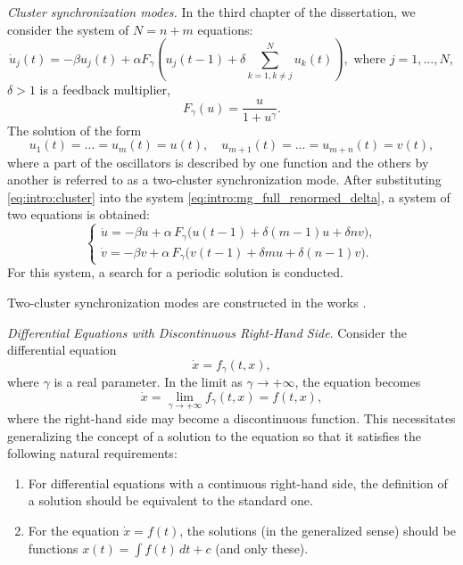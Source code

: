\textit{Cluster synchronization modes.} 
In the third chapter of the dissertation, we consider the system of $N = n + m$ equations:
\begin{equation}
	\label{eq:intro:mg_full_renormed_delta}
	\dot{u}_j(t) = -\beta u_j(t) + \alpha F_{\gamma} \left(u_j(t - 1) + \delta\sum\limits_{k = 1, k\neq j}^N u_k(t)\right), \text{ where } j = 1, \dots, N,
\end{equation}
$\delta > 1$ is a feedback multiplier, 
\[
F_{\gamma}(u) = \dfrac{u}{1 + u^{\gamma}}.
\]
The solution of the form
\begin{equation}
	\label{eq:intro:cluster}
	u_1(t)=\ldots=u_m(t) = u(t),\quad u_{m+1}(t)=\ldots=u_{m+n}(t) = v(t),
\end{equation}
where a part of the oscillators is described by one function and the others by another is referred to as a two-cluster synchronization mode. After substituting \eqref{eq:intro:cluster} into the system \eqref{eq:intro:mg_full_renormed_delta}, a system of two equations is obtained:
%
\begin{equation}
	\label{eq:intro:system_uv}
	\begin{cases}
		\dot{u} = -\beta u + \alpha \, F_{\gamma} \big(u(t - 1) + \delta (m - 1) u + \delta n v\big),\\
		\dot{v} = -\beta v + \alpha \, F_{\gamma} \big(v(t - 1) + \delta m u + \delta (n - 1) v\big).
	\end{cases}
\end{equation}
%
For this system, a search for a periodic solution is conducted.

Two-cluster synchronization modes are constructed in the works \cite{Glyzin2016a, Glyzin2022}.

\emph{Differential Equations with Discontinuous Right-Hand Side}. Consider the differential equation 
\[
\dot{x} = f_{\gamma}(t, x),
\]
where $\gamma$ is a real parameter. In the limit as $\gamma \to +\infty$, the equation becomes
\begin{equation}
	\label{eq:intro:equiv_equation_initial}
	\dot{x} = \lim\limits_{\gamma \to +\infty} f_{\gamma}(t, x) = f(t, x),
\end{equation}
where the right-hand side may become a discontinuous function. This necessitates generalizing the concept of a solution to the equation so that it satisfies the following natural requirements:
\begin{enumerate}
	\item For differential equations with a continuous right-hand side, the definition of a solution should be equivalent to the standard one.
	\item For the equation $\dot{x} = f(t)$, the solutions (in the generalized sense) should be functions $x(t) = \int f(t)\, dt + c$ (and only these).
\end{enumerate}

